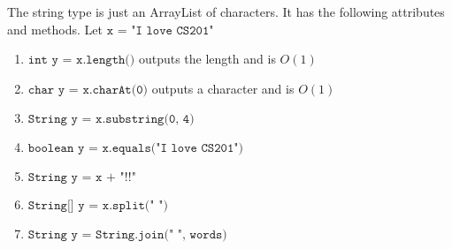  \begin{example}[String]
  The string type is just an ArrayList of characters. It has the following attributes and methods. Let $\texttt{x = "I love CS201"}$ 
  \begin{enumerate}
      \item $\texttt{int y = x.length()}$ outputs the length and is $O(1)$ 
      \item $\texttt{char y = x.charAt(0)}$ outputs a character and is $O(1)$
      \item $\texttt{String y = x.substring(0, 4)}$ 
      \item $\texttt{boolean y = x.equals("I love CS201")}$
      \item $\texttt{String y = x + "!!"}$ 
      \item $\texttt{String[] y = x.split(" ")}$
      \item $\texttt{String y = String.join(" ", words)}$
  \end{enumerate}
  \end{example}


